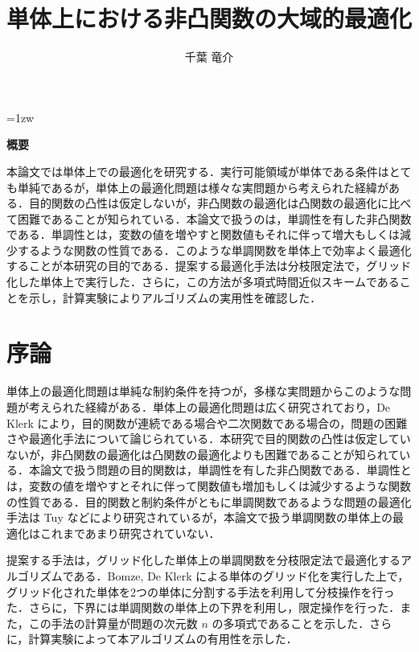 \documentclass[a4paper,11pt]{jreport}
\title{単体上における非凸関数の大域的最適化}
\author{千葉 竜介}
\begin{document}
\maketitle
\thispagestyle{empty}
\newpage

\thispagestyle{empty}
\vspace*{20pt plus 1fil}
\parindent=1zw
\noindent
\begin{center}
{\bf 概要}
\vspace{5mm}
\end{center}

本論文では単体上での最適化を研究する．実行可能領域が単体である条件はとても単純であるが，単体上の最適化問題は様々な実問題から考えられた経緯がある．目的関数の凸性は仮定しないが，非凸関数の最適化は凸関数の最適化に比べて困難であることが知られている．本論文で扱うのは，単調性を有した非凸関数である．単調性とは，変数の値を増やすと関数値もそれに伴って増大もしくは減少するような関数の性質である．このような単調関数を単体上で効率よく最適化することが本研究の目的である．提案する最適化手法は分枝限定法で，グリッド化した単体上で実行した．さらに，この方法が多項式時間近似スキームであることを示し，計算実験によりアルゴリズムの実用性を確認した．

\par
\vspace{0pt plus 1fil}
\newpage

\tableofcontents
\listoffigures

\pagebreak
\setcounter{page}{1}

\chapter{序論}

単体上の最適化問題は単純な制約条件を持つが，多様な実問題からこのような問題が考えられた経緯がある．単体上の最適化問題は広く研究されており，De Klerk \cite{deklerk_survey} により，目的関数が連続である場合や二次関数である場合の，問題の困難さや最適化手法について論じられている．本研究で目的関数の凸性は仮定していないが，非凸関数の最適化は凸関数の最適化よりも困難であることが知られている．本論文で扱う問題の目的関数は，単調性を有した非凸関数である．単調性とは，変数の値を増やすとそれに伴って関数値も増加もしくは減少するような関数の性質である．目的関数と制約条件がともに単調関数であるような問題の最適化手法は Tuy \cite{tuy} などにより研究されているが，本論文で扱う単調関数の単体上の最適化はこれまであまり研究されていない．\par
提案する手法は，グリッド化した単体上の単調関数を分枝限定法で最適化するアルゴリズムである．Bomze, De Klerk \cite{bomze} による単体のグリッド化を実行した上で，グリッド化された単体を2つの単体に分割する手法を利用して分枝操作を行った．さらに，下界には単調関数の単体上の下界を利用し，限定操作を行った．また，この手法の計算量が問題の次元数 $ n $ の多項式であることを示した．さらに，計算実験によって本アルゴリズムの有用性を示した．
\end{document}
